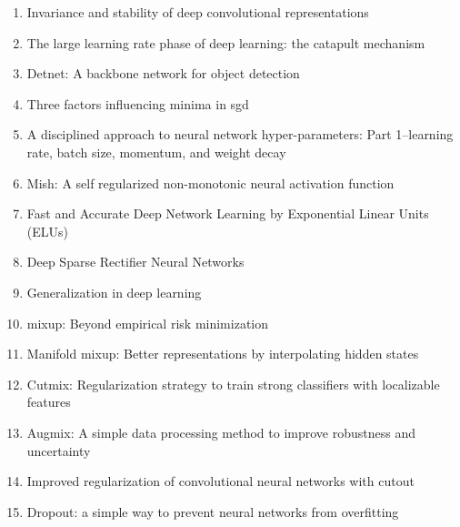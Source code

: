 \documentclass[acmlarge]{acmart}
\begin{document}
\begin{enumerate}
	\item Invariance and stability of deep convolutional representations \cite{bietti2017invariance} 

	\item The large learning rate phase of deep learning: the catapult mechanism \cite{lewkowycz2020large} 

	\item Detnet: A backbone network for object detection \cite{li2018detnet} 

	\item Three factors influencing minima in sgd \cite{jastrzkebski2017three} 

	\item A disciplined approach to neural network hyper-parameters: Part 1--learning rate, batch size, momentum, and weight decay \cite{smith2018disciplined} 

	\item Mish: A self regularized non-monotonic neural activation function \cite{misra2019mish} 

	\item Fast and Accurate Deep Network Learning by Exponential Linear Units (ELUs) \cite{clevert2015fast} 

	\item Deep Sparse Rectifier Neural Networks \cite{pmlr-v15-glorot11a} 

	\item Generalization in deep learning \cite{kawaguchi2017generalization} 

	\item mixup: Beyond empirical risk minimization \cite{zhang2017mixup} 

	\item Manifold mixup: Better representations by interpolating hidden states \cite{verma2019manifold} 

	\item Cutmix: Regularization strategy to train strong classifiers with localizable features \cite{yun2019cutmix} 

	\item Augmix: A simple data processing method to improve robustness and uncertainty \cite{hendrycks2019augmix} 

	\item Improved regularization of convolutional neural networks with cutout \cite{devries2017improved} 

	\item Dropout: a simple way to prevent neural networks from overfitting \cite{srivastava2014dropout} 


\end{enumerate}
\end{document}
